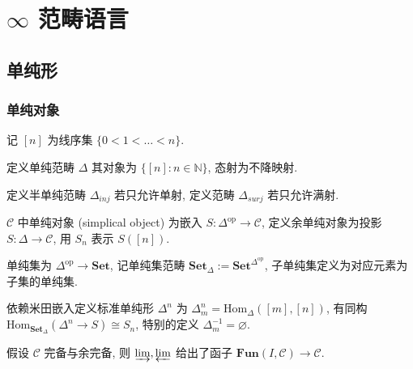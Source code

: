 \section{\(\infty\) 范畴语言}

\subsection{单纯形}

\subsubsection{单纯对象}

\begin{remark}
    记 \([n]\) 为线序集 \(\{0 < 1 < \ldots < n\}\).
\end{remark}

\begin{definition}[单纯范畴]
    定义单纯范畴 \(\Delta\) 其对象为 \(\{[n] : n \in \mathbb{N}\}\), 态射为不降映射.

    定义半单纯范畴 \(\Delta_{inj}\) 若只允许单射, 定义范畴 \(\Delta_{surj}\) 若只允许满射.
\end{definition}

\begin{definition}
    \(\mathcal{C}\) 中单纯对象 (simplical object) 为嵌入 \(S : \Delta^\mathrm{op} \to \mathcal{C}\), 定义余单纯对象为投影 \(S : \Delta \to \mathcal{C}\),
    用 \(S_n\) 表示 \(S([n])\).
\end{definition}

\begin{definition}
    单纯集为 \(\Delta^\mathrm{op} \to \mathbf{Set}\), 记单纯集范畴 \(\mathbf{Set}_\Delta := \mathbf{Set}^{\Delta^\mathrm{op}}\), 子单纯集定义为对应元素为子集的单纯集.
\end{definition}

\begin{definition}
    依赖米田嵌入定义标准单纯形 \(\Delta^n\) 为 \(\Delta_m^n = \mathrm{Hom}_{\Delta}([m], [n])\), 有同构 \(\mathrm{Hom}_{\mathbf{Set}_\Delta} (\Delta^n \to S) \cong S_n\),
    特别的定义 \(\Delta^{-1}_m = \varnothing\).
\end{definition}

\begin{lemma}
    假设 \(\mathcal{C}\) 完备与余完备, 则 \(\varinjlim,\varprojlim\) 给出了函子 \(\mathbf{Fun}(I,\mathcal{C}) \to \mathcal{C}\).
\end{lemma}

